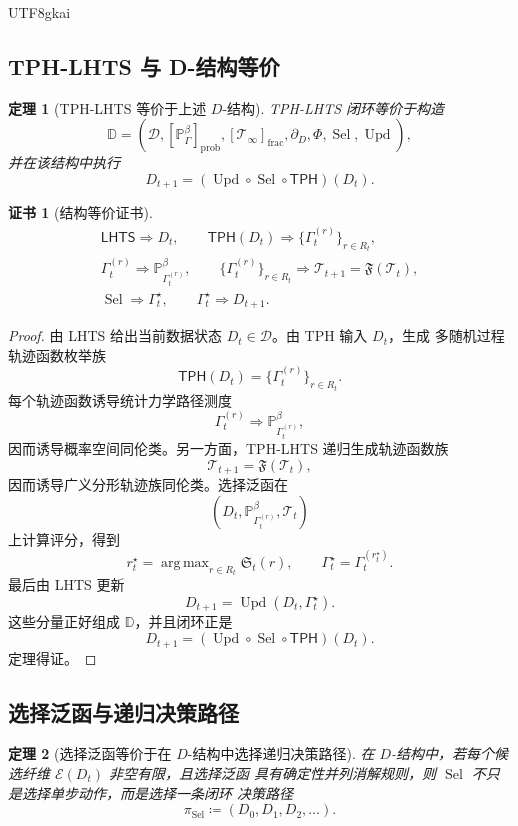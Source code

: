 \documentclass[12pt]{article}
\newtheorem{theorem}{定理}[section]
\newtheorem{Certificate}{证书}[section]
\newcommand{\LHTS}{\ensuremath{\mathsf{LHTS}}}
\newcommand{\TPH}{\ensuremath{\mathsf{TPH}}}
\newcommand{\DefEq}{\coloneqq}
\DeclareMathOperator{\Sel}{Sel}
\DeclareMathOperator{\Upd}{Upd}
\DeclareMathOperator*{\argmax}{arg\,max}
\begin{document}
\begin{CJK*}{UTF8}{gkai}
\subsection{TPH-LHTS 与 D-结构等价}
\label{subsec:tph-lhts-equivalent-d-structure}

\begin{theorem}[TPH-LHTS 等价于上述 \(D\)-结构]
TPH-LHTS 闭环等价于构造
\[
\mathbb D
=
\left(
\mathcal D,
[\mathbb P_\Gamma^\beta]_{\mathrm{prob}},
[\mathcal T_\infty]_{\mathrm{frac}},
\partial_D,
\Phi,
\Sel,
\Upd
\right),
\]
并在该结构中执行
\[
D_{t+1}=(\Upd\circ\Sel\circ\TPH)(D_t).
\]
\end{theorem}

\begin{Certificate}[结构等价证书]
\[
\boxed{
\begin{gathered}
\LHTS\Rightarrow D_t,
\qquad
\TPH(D_t)\Rightarrow\{\Gamma_t^{(r)}\}_{r\in R_t},
\\
\Gamma_t^{(r)}\Rightarrow\mathbb P_{\Gamma_t^{(r)}}^\beta,
\qquad
\{\Gamma_t^{(r)}\}_{r\in R_t}\Rightarrow
\mathcal T_{t+1}=\mathfrak F(\mathcal T_t),
\\
\Sel\Rightarrow\Gamma_t^\star,
\qquad
\Gamma_t^\star\Rightarrow D_{t+1}.
\end{gathered}
}
\]
\end{Certificate}

\begin{proof}
由 LHTS 给出当前数据状态 \(D_t\in\mathcal D\)。由 TPH 输入 \(D_t\)，生成
多随机过程轨迹函数枚举族
\[
\TPH(D_t)=\{\Gamma_t^{(r)}\}_{r\in R_t}.
\]
每个轨迹函数诱导统计力学路径测度
\[
\Gamma_t^{(r)}\Rightarrow \mathbb P_{\Gamma_t^{(r)}}^\beta,
\]
因而诱导概率空间同伦类。另一方面，TPH-LHTS 递归生成轨迹函数族
\[
\mathcal T_{t+1}=\mathfrak F(\mathcal T_t),
\]
因而诱导广义分形轨迹族同伦类。选择泛函在
\[
\left(D_t,\mathbb P_{\Gamma_t^{(r)}}^\beta,\mathcal T_t\right)
\]
上计算评分，得到
\[
r_t^\star=\argmax_{r\in R_t}\mathfrak S_t(r),
\qquad
\Gamma_t^\star=\Gamma_t^{(r_t^\star)}.
\]
最后由 LHTS 更新
\[
D_{t+1}=\Upd(D_t,\Gamma_t^\star).
\]
这些分量正好组成 \(\mathbb D\)，并且闭环正是
\[
D_{t+1}=(\Upd\circ\Sel\circ\TPH)(D_t).
\]
定理得证。
\end{proof}

\subsection{选择泛函与递归决策路径}
\label{subsec:selection-recursive-decision-path}

\begin{theorem}[选择泛函等价于在 \(D\)-结构中选择递归决策路径]
在 \(D\)-结构中，若每个候选纤维 \(\mathcal E(D_t)\) 非空有限，且选择泛函
具有确定性并列消解规则，则 \(\Sel\) 不只是选择单步动作，而是选择一条闭环
决策路径
\[
\boxed{
\pi_{\Sel}
\DefEq
(D_0,D_1,D_2,\ldots).
}
\]
\end{theorem}


\end{CJK*}
\end{document}
